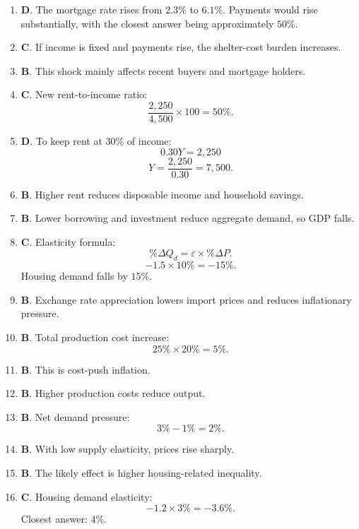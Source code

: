 \documentclass[12pt]{article}
\begin{document}
\begin{enumerate}
\item \textbf{D}. The mortgage rate rises from \(2.3\%\) to \(6.1\%\). Payments would rise substantially, with the closest answer being approximately \(50\%\).

\item \textbf{C}. If income is fixed and payments rise, the shelter-cost burden increases.

\item \textbf{B}. This shock mainly affects recent buyers and mortgage holders.

\item \textbf{C}. New rent-to-income ratio:
\[
\frac{2,250}{4,500}\times100=50\%.
\]

\item \textbf{D}. To keep rent at 30\% of income:
\[
0.30Y=2,250
\]
\[
Y=\frac{2,250}{0.30}=7,500.
\]

\item \textbf{B}. Higher rent reduces disposable income and household savings.

\item \textbf{B}. Lower borrowing and investment reduce aggregate demand, so GDP falls.

\item \textbf{C}. Elasticity formula:
\[
\%\Delta Q_d = \varepsilon \times \%\Delta P.
\]
\[
-1.5 \times 10\% = -15\%.
\]
Housing demand falls by \(15\%\).

\item \textbf{B}. Exchange rate appreciation lowers import prices and reduces inflationary pressure.

\item \textbf{B}. Total production cost increase:
\[
25\%\times 20\%=5\%.
\]

\item \textbf{B}. This is cost-push inflation.

\item \textbf{B}. Higher production costs reduce output.

\item \textbf{B}. Net demand pressure:
\[
3\%-1\%=2\%.
\]

\item \textbf{B}. With low supply elasticity, prices rise sharply.

\item \textbf{B}. The likely effect is higher housing-related inequality.

\item \textbf{C}. Housing demand elasticity:
\[
-1.2 \times 3\%=-3.6\%.
\]
Closest answer: \(4\%\).


\end{enumerate}
\end{document}
